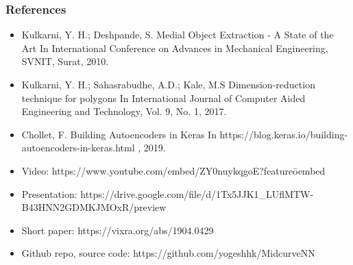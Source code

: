 \begin{frame}\frametitle{References}
\footnotesize
\begin{itemize}
\item Kulkarni, Y. H.; Deshpande, S. Medial Object Extraction - A State of the Art In International Conference on
Advances in Mechanical Engineering, SVNIT, Surat, 2010.
\item Kulkarni, Y. H.; Sahasrabudhe, A.D.; Kale, M.S Dimension-reduction technique for polygons In International
Journal of Computer Aided Engineering and Technology, Vol. 9, No. 1, 2017.
\item Chollet, F. Building Autoencoders in Keras In https://blog.keras.io/building-autoencoders-in-keras.html , 2019.
\item Video: https://www.youtube.com/embed/ZY0nuykqgoE?feature\=oembed 
\item Presentation: https://drive.google.com/file/d/1Tx5JJK1\_LUflMTW-B43HNN2GDMKJMOxR/preview
\item Short paper:  https://vixra.org/abs/1904.0429
\item Github repo, source code: https://github.com/yogeshhk/MidcurveNN
\end{itemize}
\end{frame}
